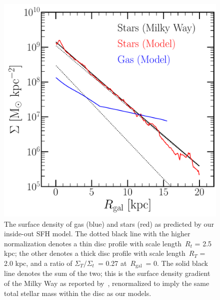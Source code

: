\documentclass[fleqn, usenatbib]{mnras}
\begin{document}
\begin{figure} 
\centering 
\includegraphics[scale = 0.45]{surface_density_gradient.pdf} 
\caption{The surface density of gas (blue) and stars (red) as predicted by our 
inside-out SFH model. The dotted black line with the higher normalization 
denotes a thin disc profile with scale length~$R_t$ = 2.5 kpc; the other 
denotes a thick disc profile with scale length~$R_T$ = 2.0 kpc, and a ratio of 
$\Sigma_T/\Sigma_t$~= 0.27 at~$R_\text{gal}$~= 0. The solid black line denotes 
the sum of the two; this is the surface density gradient of the Milky Way as 
reported by~\citet{Bland-Hawthorn2016}, renormalized to imply the same total 
stellar mass within the disc as our models. } 
\label{fig:surface_density} 
\end{figure} 
\end{document}
